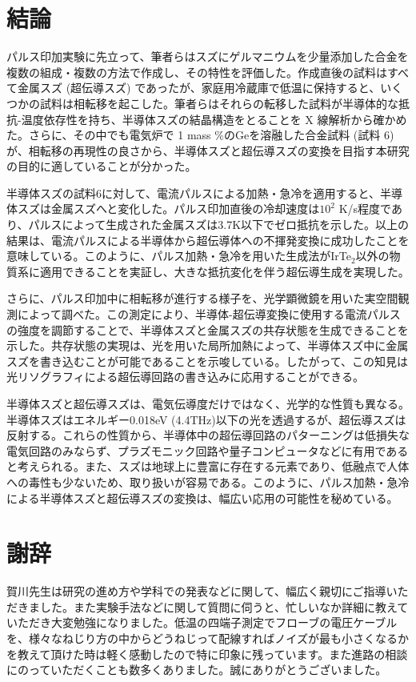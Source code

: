 \section{結論}
パルス印加実験に先立って、筆者らはスズにゲルマニウムを少量添加した合金を複数の組成・複数の方法で作成し、その特性を評価した。作成直後の試料はすべて金属スズ (超伝導スズ) であったが、家庭用冷蔵庫で低温に保持すると、いくつかの試料は相転移を起こした。筆者らはそれらの転移した試料が半導体的な抵抗-温度依存性を持ち、半導体スズの結晶構造をとることを X 線解析から確かめた。さらに、その中でも電気炉で 1 mass \%のGeを溶融した合金試料 (試料 6) が、相転移の再現性の良さから、半導体スズと超伝導スズの変換を目指す本研究の目的に適していることが分かった。

半導体スズの試料6に対して、電流パルスによる加熱・急冷を適用すると、半導体スズは金属スズへと変化した。パルス印加直後の冷却速度は$10^2$ K/s程度であり、パルスによって生成された金属スズは3.7K以下でゼロ抵抗を示した。以上の結果は、電流パルスによる半導体から超伝導体への不揮発変換に成功したことを意味している。このように、パルス加熱・急冷を用いた生成法がIrTe$_2$以外の物質系に適用できることを実証し、大きな抵抗変化を伴う超伝導生成を実現した。

さらに、パルス印加中に相転移が進行する様子を、光学顕微鏡を用いた実空間観測によって調べた。この測定により、半導体-超伝導変換に使用する電流パルスの強度を調節することで、半導体スズと金属スズの共存状態を生成できることを示した。共存状態の実現は、光を用いた局所加熱によって、半導体スズ中に金属スズを書き込むことが可能であることを示唆している。したがって、この知見は光リソグラフィによる超伝導回路の書き込みに応用することができる。

半導体スズと超伝導スズは、電気伝導度だけではなく、光学的な性質も異なる。半導体スズはエネルギー0.018eV (4.4THz)以下の光を透過するが、超伝導スズは反射する。これらの性質から、半導体中の超伝導回路のパターニングは低損失な電気回路のみならず、プラズモニック回路や量子コンピュータなどに有用であると考えられる。また、スズは地球上に豊富に存在する元素であり、低融点で人体への毒性も少ないため、取り扱いが容易である。このように、パルス加熱・急冷による半導体スズと超伝導スズの変換は、幅広い応用の可能性を秘めている。
\clearpage

\section*{謝辞}
賀川先生は研究の進め方や学科での発表などに関して、幅広く親切にご指導いただきました。また実験手法などに関して質問に伺うと、忙しいなか詳細に教えていただき大変勉強になりました。低温の四端子測定でフローブの電圧ケーブルを、様々なねじり方の中からどうねじって配線すればノイズが最も小さくなるかを教えて頂けた時は軽く感動したので特に印象に残っています。また進路の相談にのっていただくことも数多くありました。誠にありがとうございました。

